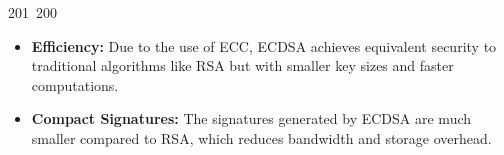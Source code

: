 201~200~\documentclass{article}
\begin{document}
\begin{itemize}
	                                                                                                                                                                                                                                                                                                	                                                                                                                                        	    	                                                                                                	                                                                                                                                                                                                                                                                                                                                	                                                                        	                                                                        	                                                                                                                                        	                                                                                                                                                                                                                        	                                                                            \item \textbf{Efficiency:} Due to the use of ECC, ECDSA achieves equivalent security to traditional algorithms like RSA but with smaller key sizes and faster computations.
	                                                                                                                                                                                                                                                                                                	                                                                                                                                        	    	                                                                                                	                                                                                                                                                                                                                                                                                                                                	                                                                        	                                                                        	                                                                                                                                        	                                                                                                                                                                                                                        	                                                                                \item \textbf{Compact Signatures:} The signatures generated by ECDSA are much smaller compared to RSA, which reduces bandwidth and storage overhead.

\end{itemize}
\end{document}
